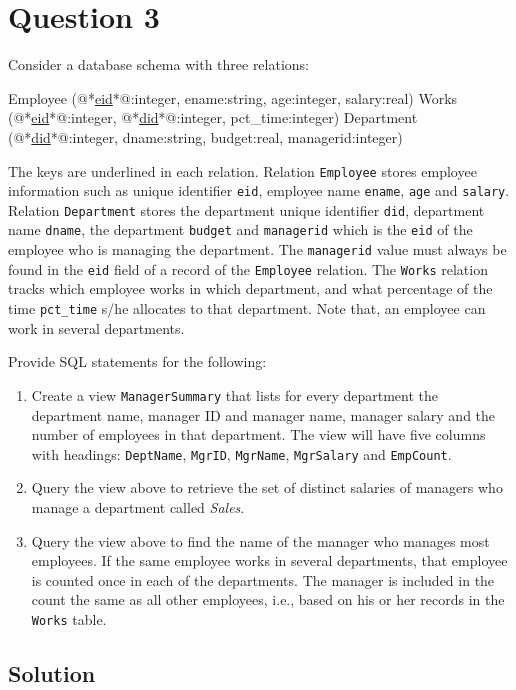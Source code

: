 
\section*{Question 3}

Consider a database schema with three relations:\\

\begin{terminal}
Employee (@*\underline{eid}*@:integer, ename:string, age:integer, salary:real)
Works (@*\underline{eid}*@:integer, @*\underline{did}*@:integer, pct\_time:integer)
Department (@*\underline{did}*@:integer, dname:string, budget:real, managerid:integer)
\end{terminal}

The keys are underlined in each relation.
Relation \texttt{Employee} stores employee information such as unique identifier \texttt{eid}, employee name \texttt{ename}, \texttt{age} and \texttt{salary}.
Relation \texttt{Department} stores the department unique identifier \texttt{did}, department name \texttt{dname}, the department \texttt{budget} and \texttt{managerid} which is the \texttt{eid} of the employee who is managing the department.
The \texttt{managerid} value must always be found in the \texttt{eid} field of a record of the \texttt{Employee} relation.
The \texttt{Works} relation tracks which employee works in which department, and what percentage of the time \texttt{pct\_time} s/he allocates to that department.
Note that, an employee can work in several departments.

Provide SQL statements for the following:

\begin{enumerate}

\item
Create a view \texttt{ManagerSummary} that lists for every department the department name, manager ID and manager name, manager salary and the number of employees in that department.
The view will have five columns with headings: \texttt{DeptName}, \texttt{MgrID}, \texttt{MgrName}, \texttt{MgrSalary} and \texttt{EmpCount}.

\item
Query the view above to retrieve the set of distinct salaries of managers who manage a department called \textit{Sales}.

\item
Query the view above to find the name of the manager  who manages most employees.
If the same employee works in several departments, that employee is counted once in each  of the departments.
The manager is included in the count the same as all other employees, i.e., based on his or her records in the \texttt{Works} table.

\end{enumerate}

\subsection*{Solution}

\lstset{language=sql}

